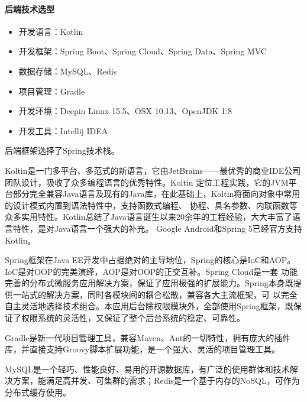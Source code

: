 \documentclass[titlepage,UTF8,linespread=1.5]{ctexart}
\begin{document}
\paragraph{后端技术选型}
\begin{itemize}
    \item 开发语言：Kotlin
    \item 开发框架：Spring Boot、Spring Cloud、Spring Data、Spring MVC
    \item 数据存储：MySQL、Redis
    \item 项目管理：Gradle
    \item 开发环境：Deepin Linux 15.5、OSX 10.13、OpenJDK 1.8
    \item 开发工具：Intellij IDEA
\end{itemize}\par
后端框架选择了Spring技术栈。\par
Koltin是一门多平台、多范式的新语言，它由JetBrains\cite{jetbrains}——最优秀的商业IDE公司团队设计，吸收了众多编程语言的优秀特性。Koltin
定位工程实践，它的JVM平台部分完全兼容Java语言及现有的Java库，在此基础上，Koltin将面向对象中常用的设计模式内置到语法特性中，支持函数式编程、
协程、具名参数、内联函数等众多实用特性。Kotlin总结了Java语言诞生以来20余年的工程经验，大大丰富了语言特性，是对Java语言一个强大的补充。
Google Android和Spring 5已经官方支持Kotlin。\par
Spring框架在Java EE开发中占据绝对的主导地位，Spring的核心是IoC和AOP。IoC是对OOP的完美演绎，AOP是对OOP的正交互补。Spring Cloud是一套
功能完善的分布式微服务应用解决方案，保证了应用极强的扩展能力。Spring本身既提供一站式的解决方案，同时各模块间的耦合松散，兼容各大主流框架，可
以完全自主灵活地选择技术组合。本应用后台除权限模块外，全部使用Spring框架，既保证了权限系统的灵活性，又保证了整个后台系统的稳定、可靠性。\par
Gradle是新一代项目管理工具，兼容Maven、Ant的一切特性，拥有庞大的插件库，并直接支持Groovy脚本扩展功能，是一个强大、灵活的项目管理工具。\par
MySQL是一个轻巧、性能良好、易用的开源数据库，有广泛的使用群体和技术解决方案，能满足高并发、可集群的需求；Redis是一个基于内存的NoSQL，可作为
分布式缓存使用。\par
\end{document}
